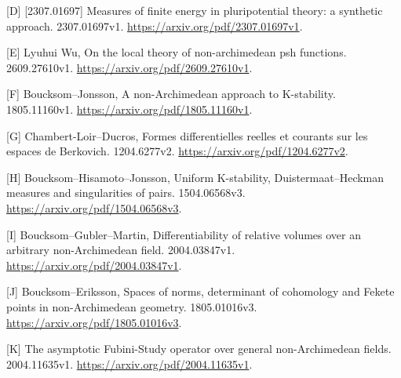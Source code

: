 \documentclass[
  10pt,
]{article}
\begin{document}
{[}D{]} {[}2307.01697{]} Measures of finite energy in pluripotential
theory: a synthetic approach. 2307.01697v1.
\url{https://arxiv.org/pdf/2307.01697v1}.

{[}E{]} Lyuhui Wu, On the local theory of non-archimedean psh functions.
2609.27610v1. \url{https://arxiv.org/pdf/2609.27610v1}.

{[}F{]} Boucksom--Jonsson, A non-Archimedean approach to K-stability.
1805.11160v1. \url{https://arxiv.org/pdf/1805.11160v1}.

{[}G{]} Chambert-Loir--Ducros, Formes differentielles reelles et
courants sur les espaces de Berkovich. 1204.6277v2.
\url{https://arxiv.org/pdf/1204.6277v2}.

{[}H{]} Boucksom--Hisamoto--Jonsson, Uniform K-stability,
Duistermaat--Heckman measures and singularities of pairs. 1504.06568v3.
\url{https://arxiv.org/pdf/1504.06568v3}.

{[}I{]} Boucksom--Gubler--Martin, Differentiability of relative volumes
over an arbitrary non-Archimedean field. 2004.03847v1.
\url{https://arxiv.org/pdf/2004.03847v1}.

{[}J{]} Boucksom--Eriksson, Spaces of norms, determinant of cohomology
and Fekete points in non-Archimedean geometry. 1805.01016v3.
\url{https://arxiv.org/pdf/1805.01016v3}.

{[}K{]} The asymptotic Fubini-Study operator over general
non-Archimedean fields. 2004.11635v1.
\url{https://arxiv.org/pdf/2004.11635v1}.
\end{document}
